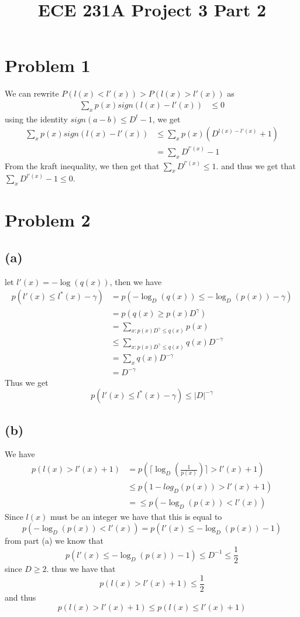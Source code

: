 
\title{ECE 231A Project 3 Part 2}

\maketitle
\section*{Problem 1}
We can rewrite $P(l(x)<l'(x))>P(l(x)>l'(x))$ as
\begin{align*}
    \sum_{x} p(x)sign(l(x)-l'(x))&\leq 0
\end{align*}
using the identity $sign(a-b)\leq D^t-1$, we get
\begin{align*}
    \sum_{x} p(x)sign(l(x)-l'(x))&\leq \sum_{x} p(x)\left(D^{l(x)-l'(x)}+1\right)\\
    &=\sum_{x}D^{l'(x)}-1
\end{align*}
From the kraft inequality, we then get that $\sum_{x}D^{l'(x)}\leq 1$.
and thus we get that $\sum_{x}D^{l'(x)}-1\leq 0$.
\section*{Problem 2}
\subsection*{(a)}
let $l'(x)=-\log(q(x))$, then we have
\begin{align*}
    p(l'(x)\leq l^*(x)-\gamma)&=p(-\log_D(q(x))\leq -\log_D(p(x))-\gamma)\\
    &=p(q(x)\geq p(x)D^{\gamma})\\
    &=\sum_{x:p(x)D^{\gamma}\leq q(x)}p(x)\\
    &\leq \sum_{x:p(x)D^{\gamma}\leq q(x)}q(x)D^{-\gamma}\\
    &=\sum_{x}q(x)D^{-\gamma}\\
    &=D^{-\gamma}
\end{align*} 
Thus we get
$$
    p(l'(x)\leq l^*(x)-\gamma)\leq |D|^{-\gamma}$$   
\subsection*{(b)}
We have 
\begin{align*}
    p(l(x)>l'(x)+1)&=p\left(\lceil \log_D\left(\frac{1}{p(x)}\right)\rceil >l'(x)+1\right)\\
    &\leq p(1-log_D(p(x))>l'(x)+1)\\
    &=\leq p(-\log_D(p(x))<l'(x))
\end{align*}
Since $l(x)$ must be an integer we have that this is equal to 
$$p(-\log_D(p(x))<l'(x))=p(l'(x)\leq-\log_D(p(x))-1)$$
from part (a) we know that 
$$p(l'(x)\leq-\log_D(p(x))-1)\leq D^{-1}\leq \frac{1}{2}$$
since $D\geq 2$. thus we have that 
$$p(l(x)>l'(x)+1)\leq \frac{1}{2}$$
and thus 
$$p(l(x)>l'(x)+1)\leq p(l(x)\leq l'(x)+1)$$
